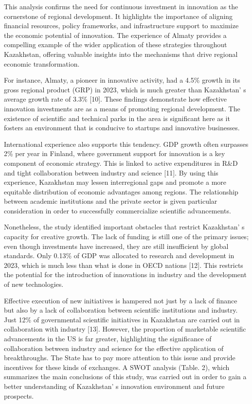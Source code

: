 \begin{multicols}{2}
This analysis confirms the need for continuous investment in innovation
as the cornerstone of regional development. It highlights the importance
of aligning financial resources, policy frameworks, and infrastructure
support to maximize the economic potential of innovation. The experience
of Almaty provides a compelling example of the wider application of
these strategies throughout Kazakhstan, offering valuable insights into
the mechanisms that drive regional economic transformation.

For instance, Almaty, a pioneer in innovative activity, had a 4.5\%
growth in its gross regional product (GRP) in 2023, which is much
greater than Kazakhstan' s average growth rate of 3.3\%
{[}10{]}. These findings demonstrate how effective innovation
investments are as a means of promoting regional development. The
existence of scientific and technical parks in the area is significant
here as it fosters an environment that is conducive to startups and
innovative businesses.

International experience also supports this tendency. GDP growth often
surpasses 2\% per year in Finland, where government support for
innovation is a key component of economic strategy. This is linked to
active expenditures in R\&D and tight collaboration between industry and
science {[}11{]}. By using this experience, Kazakhstan may lessen
interregional gaps and promote a more equitable distribution of economic
advantages among regions. The relationship between academic institutions
and the private sector is given particular consideration in order to
successfully commercialize scientific advancements.

Nonetheless, the study identified important obstacles that restrict
Kazakhstan' s capacity for creative growth. The lack of
funding is still one of the primary issues; even though investments have
increased, they are still insufficient by global standards. Only 0.13\%
of GDP was allocated to research and development in 2023, which is much
less than what is done in OECD nations {[}12{]}. This restricts the
potential for the introduction of innovations in industry and the
development of new technologies.

Effective execution of new initiatives is hampered not just by a lack of
finance but also by a lack of collaboration between scientific
institutions and industry. Just 12\% of governmental scientific
initiatives in Kazakhstan are carried out in collaboration with industry
{[}13{]}. However, the proportion of marketable scientific advancements
in the US is far greater, highlighting the significance of collaboration
between industry and science for the effective application of
breakthroughs. The State has to pay more attention to this issue and
provide incentives for these kinds of exchanges. A SWOT analysis (Table.
2), which summarizes the main conclusions of this study, was carried out
in order to gain a better understanding of Kazakhstan' s
innovation environment and future prospects.
\end{multicols}

